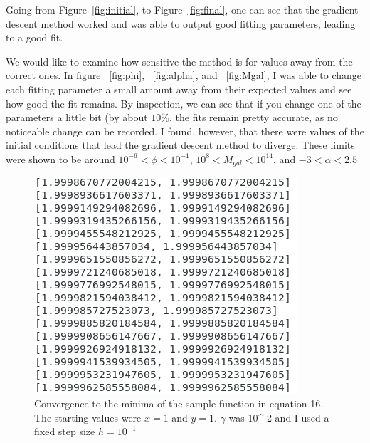 \documentclass[12pt]{article}
\begin{document}
Going from Figure~\ref{fig:initial}, to Figure~\ref{fig:final}, one can see that the gradient descent method worked and was able to output good fitting parameters, leading to a good fit.

We would like to examine how sensitive the method is for values away from the correct ones. In figure ~\ref{fig:phi}, ~\ref{fig:alpha}, and ~\ref{fig:Mgal}, I was able to change each fitting parameter a small amount away from their expected values and see how good the fit remains. By inspection, we can see that if you change one of the parameters a little bit (by about $10\%$, the fits remain pretty accurate, as no noticeable change can be recorded. I found, however, that there were values of the initial conditions that lead the gradient descent method to diverge. These limits were shown to be around $10^{-6}<\phi<10^{-1}$, $10^8 < M_{gal} < 10^{14}$, and $-3 < \alpha < 2.5$

\begin{figure}
    \centering
    \includegraphics{HW2_samplefunc_convergence.png}
    \caption{Convergence to the minima of the sample function in equation 16. The starting values were $x=1$ and $y=1$. $\gamma$ was 10^{-2} and I used a fixed step size $h = 10^{-1}$}
    \label{fig:conv2d}
\end{figure}{}
\end{document}
